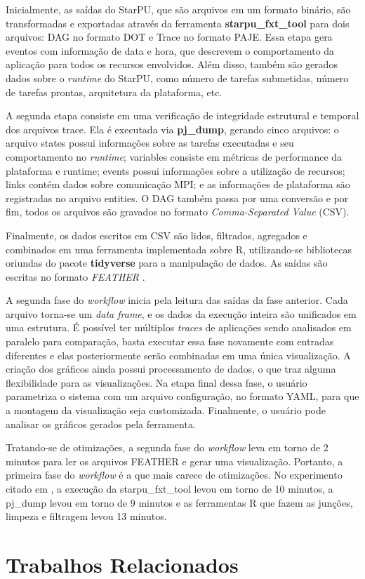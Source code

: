 Inicialmente, as saídas do StarPU, que são arquivos em um formato binário, são 
transformadas e exportadas através da ferramenta \textbf{starpu\_fxt\_tool} para dois 
arquivos: DAG no formato DOT e Trace no formato PAJE. Essa etapa gera
eventos com informação de data e hora, que descrevem o comportamento da aplicação para todos os recursos 
envolvidos. Além disso, também são gerados dados sobre o \emph{runtime} do StarPU, como 
número de tarefas submetidas, número de tarefas prontas, arquitetura da plataforma, etc.

A segunda etapa consiste em uma verificação de integridade estrutural e temporal dos
arquivos trace. Ela é executada via \textbf{pj\_dump}, gerando cinco arquivos: o arquivo states 
possui informações sobre as tarefas executadas e seu comportamento no \emph{runtime}; variables
consiste em métricas de performance da plataforma e runtime; events possui informações sobre a 
utilização de recursos; links contém dados sobre comunicação MPI; e as informações de plataforma 
são registradas no arquivo entities. O DAG também passa por uma conversão e por fim, todos os 
arquivos são gravados no formato \emph{Comma-Separated Value} (CSV).

Finalmente, os dados escritos em CSV são lidos, filtrados, agregados e combinados em 
uma ferramenta implementada sobre R, utilizando-se bibliotecas oriundas do pacote 
\textbf{tidyverse} para a manipulação de dados. As saídas são escritas no formato \emph{FEATHER}
\cite{ref:feather}.

A segunda fase do \emph{workflow} inicia pela leitura das saídas da fase anterior. Cada arquivo
torna-se um \emph{data frame}, e os dados da execução inteira são unificados em uma estrutura.
É possível ter múltiplos \emph{traces} de aplicações sendo analisados em paralelo
para comparação, basta executar essa fase novamente com entradas diferentes e 
elas posteriormente serão combinadas em uma única visualização. A criação dos gráficos ainda 
possui processamento de dados, o que traz alguma flexibilidade para as visualizações. Na 
etapa final dessa fase, o usuário parametriza o sistema com um arquivo configuração, no formato
YAML, para que a montagem da visualização seja customizada. Finalmente, o usuário pode analisar os 
gráficos gerados pela ferramenta.

Tratando-se de otimizações, a segunda fase do \emph{workflow} leva em torno de 2 minutos para ler os
arquivos FEATHER e gerar uma visualização. Portanto, a primeira fase do \emph{workflow} é a que mais carece de otimizações.
No experimento citado em \citet{ref:starvz}, a execução da starpu\_fxt\_tool levou em torno de 10 minutos, a 
pj\_dump levou em torno de 9 minutos e as ferramentas R que fazem as junções, limpeza e filtragem levou 13 minutos.



\section{Trabalhos Relacionados}\label{sect:related-work}